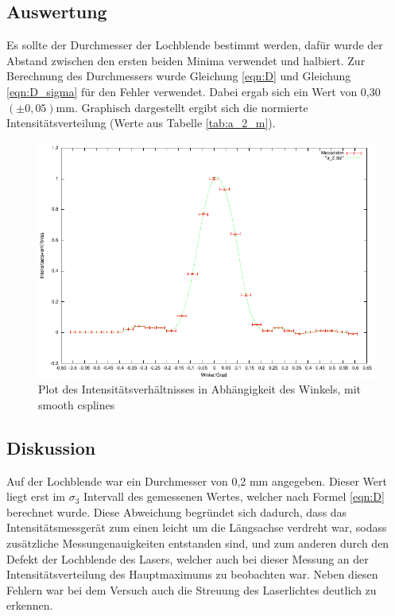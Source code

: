 \documentclass[12pt]{scrartcl}
\begin{document}
\subsection{Auswertung}
Es sollte der Durchmesser der Lochblende bestimmt werden, dafür wurde der Abstand zwischen den ersten beiden Minima verwendet und halbiert. Zur Berechnung des Durchmessers wurde Gleichung \ref{eqn:D} und Gleichung \ref{eqn:D_sigma} für den Fehler verwendet. Dabei ergab sich ein Wert von 0,30 $(\pm 0,05)$mm. Graphisch dargestellt ergibt sich die normierte Intensitätsverteilung (Werte aus Tabelle \ref{tab:a_2_m}).

\begin{figure}[H]
\centering
    \includegraphics[scale = 1]{a_2.pdf}
  	\caption[Plot des Intensitätsverhältnisses in Abhängigkeit des Winkels, mit theoretischer Vorhersage]{Plot des Intensitätsverhältnisses in Abhängigkeit des Winkels, mit smooth csplines}
  \label{fig:a_2}
\end{figure}

\subsection{Diskussion}
Auf der Lochblende war ein Durchmesser von 0,2 mm angegeben. Dieser Wert liegt erst im $\sigma_3$ Intervall des gemessenen Wertes, welcher nach Formel \ref{eqn:D} berechnet wurde. Diese Abweichung begründet sich dadurch, dass das Intensitätsmessgerät zum einen leicht um die
Längsachse verdreht war, sodass zusätzliche Messungenauigkeiten entstanden sind, und zum anderen durch den Defekt der Lochblende des Lasers, welcher auch bei dieser Messung an der Intensitätsverteilung des Hauptmaximums zu beobachten war. Neben diesen Fehlern war bei dem Versuch auch die Streuung des Laserlichtes deutlich zu erkennen.
\end{document}
